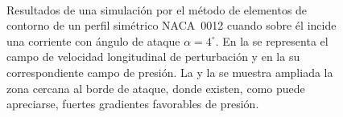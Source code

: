 \begin{figure}
\centering
{}
 \\
\caption{Resultados de una simulación por el método de elementos de contorno de un perfil simétrico NACA~0012 cuando sobre él incide una corriente con ángulo de ataque $\alpha = 4^{\circ}$. En la  se representa el campo de velocidad longitudinal de perturbación y en la  su correspondiente campo de presión. La  y la  se muestra ampliada la zona cercana al borde de ataque, donde existen, como puede apreciarse, fuertes gradientes favorables de presión.}
\end{figure}



